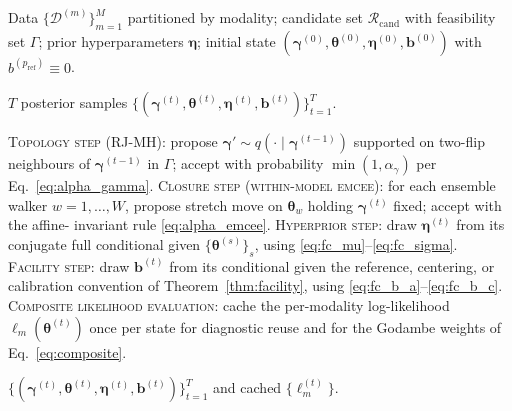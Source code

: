 \documentclass[12pt]{article}
\theoremstyle{plain}
\theoremstyle{definition}
\theoremstyle{remark}
\newcommand{\HBMAE}{HBMAE\xspace}
\begin{document}
\begin{algorithm}[ht]
\caption{\HBMAE\ Gibbs--MH sampler}\label{alg:hbmae}
\begin{algorithmic}[1]
\Require \parbox[t]{0.82\linewidth}{Data $\{\mathcal{D}^{(m)}\}_{m=1}^M$
         partitioned by modality; candidate set $\mathcal{R}_{\mathrm{cand}}$
         with feasibility set $\Gamma$; prior hyperparameters
         $\boldsymbol{\eta}$; initial state
         $(\boldsymbol\gamma^{(0)},\boldsymbol\theta^{(0)},
         \boldsymbol\eta^{(0)},\mathbf{b}^{(0)})$ with
         $b^{(p_{\mathrm{ref}})}\equiv 0$.}
\Ensure \parbox[t]{0.82\linewidth}{$T$ posterior samples
         $\{(\boldsymbol\gamma^{(t)},\boldsymbol\theta^{(t)},
         \boldsymbol\eta^{(t)},\mathbf{b}^{(t)})\}_{t=1}^T$.}
  \State \textsc{Topology step (RJ-MH)}: propose
         $\boldsymbol\gamma' \sim q(\cdot \mid \boldsymbol\gamma^{(t-1)})$
         supported on two-flip neighbours of $\boldsymbol\gamma^{(t-1)}$ in
         $\Gamma$; accept with probability $\min(1,\alpha_\gamma)$ per
         Eq.~\eqref{eq:alpha_gamma}.
  \State \textsc{Closure step (within-model emcee)}: for each ensemble walker
         $w = 1,\ldots,W$, propose stretch move on $\boldsymbol\theta_w$
         holding $\boldsymbol\gamma^{(t)}$ fixed; accept with the affine-
         invariant rule \eqref{eq:alpha_emcee}.
  \State \textsc{Hyperprior step}: draw $\boldsymbol\eta^{(t)}$ from its
         conjugate full conditional given $\{\boldsymbol\theta^{(s)}\}_s$,
         using \eqref{eq:fc_mu}--\eqref{eq:fc_sigma}.
  \State \textsc{Facility step}: draw $\mathbf{b}^{(t)}$ from its conditional
         given the reference, centering, or calibration convention of
         Theorem~\ref{thm:facility}, using \eqref{eq:fc_b_a}--\eqref{eq:fc_b_c}.
  \State \textsc{Composite likelihood evaluation}: cache the per-modality
         log-likelihood $\ell_m(\boldsymbol\theta^{(t)})$ once per state for
         diagnostic reuse and for the Godambe weights of
         Eq.~\eqref{eq:composite}.
\EndFor
\State \Return \parbox[t]{0.82\linewidth}{$\{(\boldsymbol\gamma^{(t)},
       \boldsymbol\theta^{(t)},\boldsymbol\eta^{(t)},
       \mathbf{b}^{(t)})\}_{t=1}^T$ and cached $\{\ell_m^{(t)}\}$.}
\end{algorithmic}
\end{algorithm}
\end{document}

